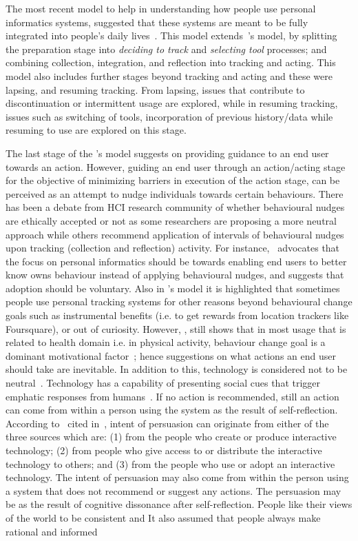 The most recent model to help in understanding how people use personal informatics systems, suggested that these systems are meant to be fully integrated into people's daily lives~\citep{epstein2015lived}. This model extends~\cite{li2010stage}'s model, by splitting the preparation stage into \emph{deciding to track} and \emph{selecting tool} processes; and combining collection, integration, and reflection into tracking and acting. This model also includes further stages beyond tracking and acting and these were lapsing, and resuming tracking.  From lapsing, issues that contribute to discontinuation or intermittent usage are explored, while in resuming tracking, issues such as switching of tools, incorporation of previous history/data while resuming to use are explored on this stage.  

The last stage of the \cite{li2010stage}'s model suggests on providing guidance to an end user towards an action. However, guiding an end user through an action/acting stage for the objective of minimizing barriers in execution of the action stage, can be perceived as an attempt to nudge individuals towards certain behaviours. There has been a debate from HCI research community of whether behavioural nudges are ethically accepted or not as some researchers are proposing a more neutral approach while others recommend application of intervals of behavioural nudges upon tracking (collection and reflection) activity.  For instance,~\cite{munson2012mindfulness} advocates that the focus on personal informatics  should be towards enabling end users to better know owns behaviour instead of applying behavioural nudges, and suggests that adoption should be voluntary. Also in \cite{epstein2015lived}'s model it is highlighted that sometimes people use personal tracking systems for other reasons beyond behavioural change goals such as instrumental benefits (i.e. to get rewards from location trackers like Foursquare), or out of curiosity. However, \cite{epstein2015lived}, still  shows that in most usage that is related to health domain i.e. in physical activity, behaviour change goal is a dominant motivational factor~\citep{epstein2015lived}; hence suggestions on what actions an end user should take are inevitable. In addition to this, technology is considered not to be neutral~\citep{Oinas-kukkonen:psd}. Technology has a capability of presenting social cues that trigger emphatic responses from humans~\citep{foggpersuasivebook}. If no action is recommended, still an action can come from within a person using the system as the result of self-reflection. According to~\cite{fogg1998persuasive} cited in~\cite{Oinas-kukkonen:psd}, intent of persuasion can originate from either of the three sources which are: (1) from the people who create or produce interactive technology; (2) from people who give access to or distribute the interactive technology to others; and (3) from the people who use or adopt an interactive technology. The intent of persuasion may also come from within the person using a system that does not recommend or suggest any actions. The persuasion may be as the result of cognitive dissonance after self-reflection. People like their views of the world to be consistent and It also assumed that people always make rational and informed 